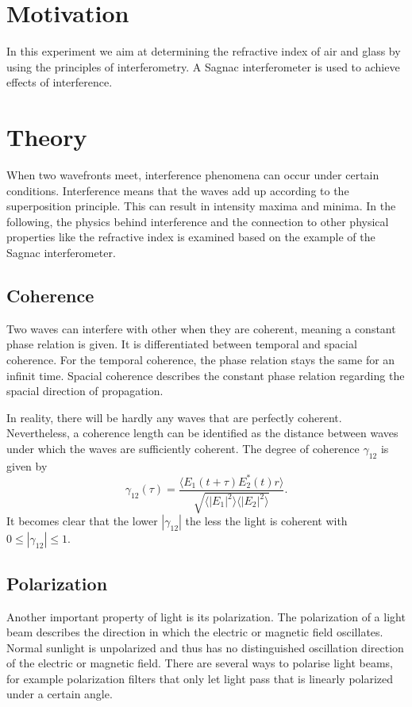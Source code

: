 \section{Motivation}
\label{sec:Motivation}
In this experiment we aim at determining the refractive index of air and glass by using the principles of interferometry. A Sagnac interferometer is used to achieve
effects of interference.

\section{Theory}
\label{sec:Theory}
When two wavefronts meet, interference phenomena can occur under certain conditions. Interference means that the waves add up according to the superposition principle. This can result in
intensity maxima and minima.
In the following, the physics behind interference and the connection to other physical properties like the refractive index is examined based on the example of the Sagnac interferometer.

\subsection{Coherence}
\label{sec:Coherence}
Two waves can interfere with other when they are coherent, meaning a constant phase relation is given. It is differentiated between temporal and spacial coherence. For the temporal
coherence, the phase relation stays the same for an infinit time. Spacial coherence describes the constant phase relation regarding the spacial direction of propagation.

In reality, there will be hardly any waves that are perfectly coherent. Nevertheless, a coherence length can be identified as the distance between waves under which the waves are sufficiently
coherent. The degree of coherence $\gamma_{12}$ is given by
\begin{equation*}
    \gamma_{12}(\tau)= \frac{\langle E_1(t+\tau)E^{*}_2(t) r \rangle}{\sqrt{\langle|E_1|^2\rangle\langle|E_2|^2\rangle}}. 
\end{equation*}
It becomes clear that the lower $|\gamma_{12}|$ the less the light is coherent with $0≤|\gamma_{12}|≤1$.

\subsection{Polarization}
\label{sec:Polarization}
Another important property of light is its polarization. The polarization of a light beam describes the direction in which the electric or magnetic field oscillates. Normal sunlight 
is unpolarized and thus has no distinguished oscillation direction of the electric or magnetic field. There are several ways to polarise light beams, for example polarization filters that only
let light pass that is linearly polarized under a certain angle.

